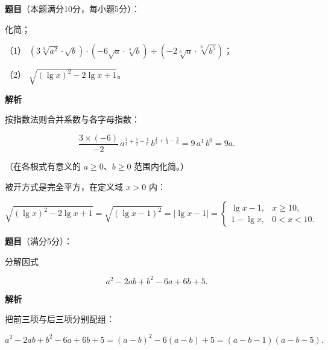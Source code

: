 \begin{answer}

\textbf{题目}（本题满分10分，每小题5分）：

化简；

（1） $\left(3\sqrt[3]{a^2}\cdot\sqrt{b}\right)\cdot\left(-6\sqrt{a}\cdot\sqrt[3]{b}\right)\div\left(-2\sqrt[6]{a}\cdot\sqrt[6]{b^5}\right)$；

（2） $\sqrt{(\lg x)^2-2\lg x+1}$。

\textbf{解析}


按指数法则合并系数与各字母指数：

\nopagebreak[4]
\[
\frac{3\times(-6)}{-2}\,a^{\frac{2}{3}+\frac{1}{2}-\frac{1}{6}}\,b^{\frac{1}{2}+\frac{1}{3}-\frac{5}{6}}
=9\,a^{1}\,b^{0}=9a.
\]

（在各根式有意义的 $a\ge0$、$b\ge0$ 范围内化简。）


被开方式是完全平方，在定义域 $x>0$ 内：

\nopagebreak[4]
\[
\sqrt{(\lg x)^2-2\lg x+1}=\sqrt{(\lg x-1)^2}=|\lg x-1|
=\begin{cases}
\lg x-1,&x\ge10,\\
1-\lg x,&0<x<10.
\end{cases}
\]



\end{answer}
\begin{answer}

\textbf{题目}（满分5分）：

分解因式

\nopagebreak[4]
\[
a^2-2ab+b^2-6a+6b+5.
\]

\textbf{解析}

把前三项与后三项分别配组：

\nopagebreak[4]
\[
a^2-2ab+b^2-6a+6b+5=(a-b)^2-6(a-b)+5=(a-b-1)(a-b-5).
\]


\end{answer}

